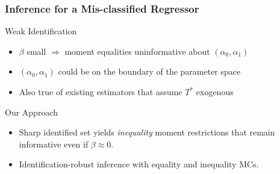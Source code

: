 \documentclass[handout]{beamer}
\begin{document}
\begin{frame}[label=INEQ_BODY]
  \frametitle{Inference for a Mis-classified Regressor}
  \small

  \begin{block}{Weak Identification}
\begin{itemize}
  \item $\beta$ small $\Rightarrow$ moment equalities uninformative about $(\alpha_0, \alpha_1)$ \hyperlink{MEQS_APPEND}{}
  \item $(\alpha_0, \alpha_1)$ could be on the boundary of the parameter space
  \item Also true of existing estimators that assume $T^*$ exogenous
\end{itemize}
\end{block}

\begin{alertblock}{Our Approach}

  \begin{itemize}
    \item Sharp identified set yields \emph{inequality} moment restrictions that remain informative even if $\beta \approx 0$.
      \hyperlink{INEQ_APPEND}{}
    \item Identification-robust inference with equality and inequality MCs.
  \end{itemize}
\end{alertblock}



\end{frame}

\end{document}
